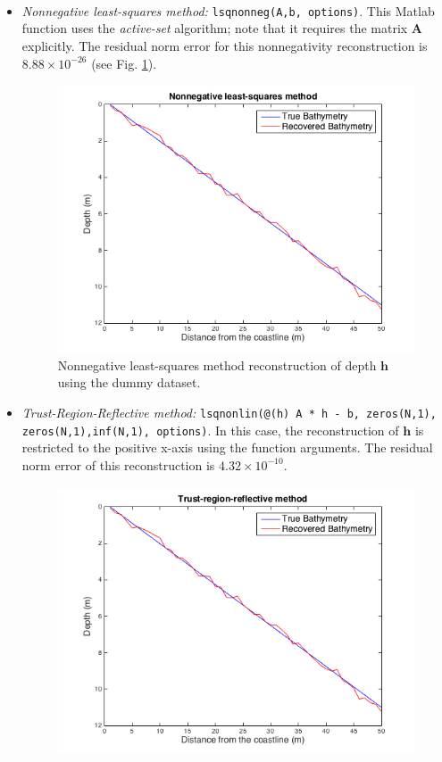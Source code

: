 \begin{itemize}
\item[(1)]  \textit{Nonnegative least-squares method:}  \verb|lsqnonneg(A,b, options)|. This Matlab\textsuperscript{\textregistered} function uses the \textit{active-set} algorithm; note that it requires the matrix $\mathbf{A}$ explicitly. The residual norm error for this nonnegativity reconstruction is $8.88 \times 10^{-26}$ (see Fig. \ref{nonLS_fig}).   \\

\begin{figure}[H]
\center
\includegraphics[scale=0.475]{img/NonLS_linear.png} 
\caption{Nonnegative least-squares method reconstruction of depth $\mathbf{h}$ using the dummy dataset.}
\label{nonLS_fig}
\end{figure}
\item[(2)]  \textit{Trust-Region-Reflective method:}  \verb|lsqnonlin(@(h) A * h - b, zeros(N,1),| \\ \verb|zeros(N,1),inf(N,1), options)|. In this case, the reconstruction of $\mathbf{h}$ is restricted to the positive x-axis using the function arguments. The residual norm error of this reconstruction is $4.32 \times 10^{-10}$. 
\begin{figure}[H]
\center
\includegraphics[scale=0.6]{img/trust_region_linear.png} 

\end{figure}
\end{itemize}
